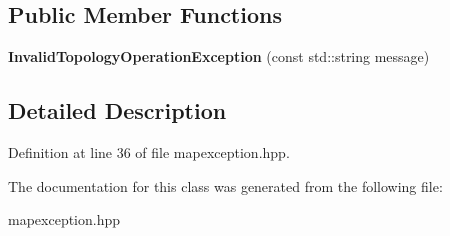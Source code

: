 \subsection*{Public Member Functions}
\begin{DoxyCompactItemize}
\item 
\hypertarget{class_invalid_topology_operation_exception_aa3e3b3739915daf9e1f6fda503e9aee2}{}\label{class_invalid_topology_operation_exception_aa3e3b3739915daf9e1f6fda503e9aee2} 
{\bfseries Invalid\+Topology\+Operation\+Exception} (const std\+::string message)
\end{DoxyCompactItemize}


\subsection{Detailed Description}


Definition at line 36 of file mapexception.\+hpp.



The documentation for this class was generated from the following file\+:\begin{DoxyCompactItemize}
\item 
mapexception.\+hpp\end{DoxyCompactItemize}
